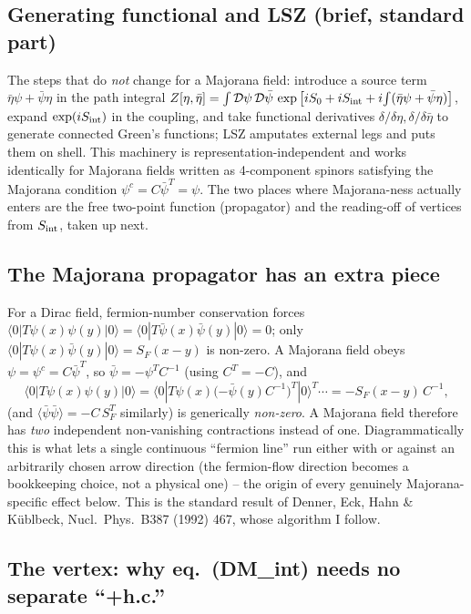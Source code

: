 \documentclass[11pt,a4paper]{article}
\begin{document}
\subsection{Generating functional and LSZ (brief, standard part)}

The steps that do \emph{not} change for a Majorana field: introduce a source
term $\bar\eta\psi+\bar\psi\eta$ in the path integral
$Z[\eta,\bar\eta]=\int\mathcal D\psi\,\mathcal D\bar\psi\,\exp\big[iS_0+iS_{\rm int}
+i\!\int(\bar\eta\psi+\bar\psi\eta)\big]$, expand $\exp(iS_{\rm int})$ in the
coupling, and take functional derivatives $\delta/\delta\eta,\delta/\delta\bar\eta$
to generate connected Green's functions; LSZ amputates external legs and
puts them on shell. This machinery is representation-independent and works
identically for Majorana fields written as 4-component spinors satisfying
the Majorana condition $\psi^c=C\bar\psi^T=\psi$. The two places where
Majorana-ness actually enters are the free two-point function (propagator)
and the reading-off of vertices from $S_{\rm int}$, taken up next.

\subsection{The Majorana propagator has an extra piece}

For a Dirac field, fermion-number conservation forces $\langle
0|T\psi(x)\psi(y)|0\rangle=\langle0|T\bar\psi(x)\bar\psi(y)|0\rangle=0$; only
$\langle0|T\psi(x)\bar\psi(y)|0\rangle=S_F(x-y)$ is non-zero. A Majorana
field obeys $\psi=\psi^c=C\bar\psi^T$, so $\bar\psi=-\psi^TC^{-1}$
(using $C^T=-C$), and
\begin{equation}
  \langle0|T\psi(x)\psi(y)|0\rangle
  = \langle0|T\psi(x)\big({-\bar\psi(y)C^{-1}}\big)^T|0\rangle^T\cdots
  = -S_F(x-y)\,C^{-1},
  \label{eq:majprop2}
\end{equation}
(and $\langle\bar\psi\bar\psi\rangle=-C\,S_F^T$ similarly) is generically
\emph{non-zero}. A Majorana field therefore has \emph{two} independent
non-vanishing contractions instead of one. Diagrammatically this is what
lets a single continuous ``fermion line'' run either with or against an
arbitrarily chosen arrow direction (the fermion-flow direction becomes a
bookkeeping choice, not a physical one) -- the origin of every genuinely
Majorana-specific effect below. This is the standard result of Denner, Eck,
Hahn \& K\"ublbeck, Nucl.\ Phys.\ B387 (1992) 467, whose algorithm I follow.

\subsection{The vertex: why eq.~(DM\_int) needs no separate ``+h.c.''}
\end{document}
